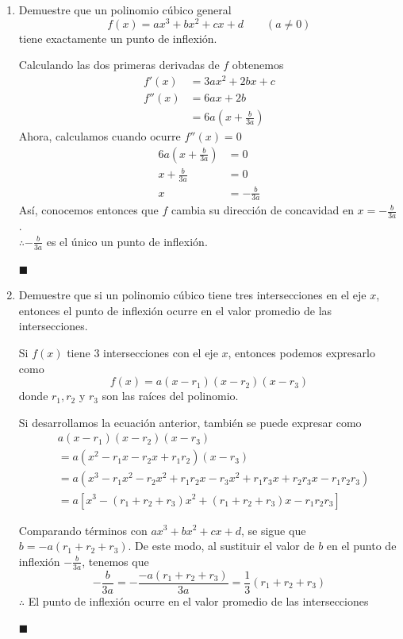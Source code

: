 \documentclass[12pt]{article}
\begin{document}
\begin{enumerate}[label=(\alph*)]
\item Demuestre que un polinomio cúbico general
  \[
  f(x) = ax^3 + bx^2 + cx + d \qquad (a\neq 0)
  \]
  tiene exactamente un punto de inflexión.

  Calculando las dos primeras derivadas de $f$ obtenemos
  \begin{align*}
    f'(x)
    &= 3ax^2 + 2bx +c \\
    f''(x)
    &= 6ax +2b \\
    &= 6a\left(x+\frac{b}{3a}\right)
  \end{align*}
  Ahora, calculamos cuando ocurre $f''(x)=0$
  \begin{align*}
    6a\left(x+\frac{b}{3a}\right)
    &= 0\\
    x+\frac{b}{3a}
    &= 0 \\
    x
    &= -\frac{b}{3a}
  \end{align*}
  Así, conocemos entonces que $f$ cambia su dirección de concavidad en $x=-\frac{b}{3a}$. \\ 
  $\therefore -\frac{b}{3a}$ es el único un punto de inflexión.
  \
  \begin{flushright}
    $\blacksquare$
  \end{flushright}

\item Demuestre que si un polinomio cúbico tiene tres intersecciones en el eje $x$, entonces el punto de inflexión ocurre en el valor promedio de las intersecciones.

  Si $f(x)$ tiene 3 intersecciones con el eje $x$, entonces podemos expresarlo como
  \[
  f(x)=a(x-r_1​)(x-r_2​)(x-r_3​)
  \]
  donde $r_1,r_2$ y $r_3​$ son las raíces del polinomio.
  
  Si desarrollamos la ecuación anterior, también se puede expresar como
  \begin{align*}
    & a(x-r_1​)(x-r_2​)(x-r_3​) \\
    & = a(x^2-r_1x-r_2x+r_1r_2)(x-r_3) \\
    & = a(x^3-r_1x^2-r_2x^2+r_1r_2x-r_3x^2+r_1r_3x+r_2r_3x-r_1r_2r_3) \\
    & = a[x^3-(r_1+r_2+r_3)x^2+(r_1+r_2+r_3)x-r_1r_2r_3]
  \end{align*}

  Comparando términos con $ax^3 + bx^2 + cx + d$, se sigue que $b=-a(r_1+r_2+r_3)$. De este modo, al sustituir el valor de $b$ en el punto de inflexión $-\frac{b}{3a}$, tenemos que
  \[
  -\frac{b}{3a}= -\frac{-a(r_1+r_2+r_3)}{3a}=\frac{1}{3}(r_1+r_2+r_3)
  \]
  $\therefore $ El punto de inflexión ocurre en el valor promedio de las intersecciones
  \begin{flushright}
    $\blacksquare$
  \end{flushright}



\end{enumerate}
\end{document}
